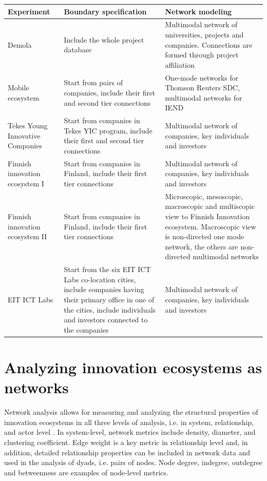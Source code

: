 \begingroup
{}\label{tab:networkdesign}
\begin{tabular}{p{3cm} p{4cm} p{5cm}}
\toprule
Experiment & Boundary specification & Network modeling \\
\midrule

Demola &
Include the whole project database &
Multimodal network of universities, projects and companies. Connections are formed through project affiliation \\

Mobile ecosystem &
Start from pairs of companies, include their first and second tier connections &
One-mode networks for Thomson Reuters SDC, multimodal networks for IEND \\

Tekes Young Innovative Companies &
Start from companies in Tekes YIC program, include their first and second tier connections &
Multimodal network of companies, key individuals and investors \\

Finnish innovation ecosystem I & 
Start from companies in Finland, include their first tier connections & 
Multimodal network of companies, key individuals and investors \\

Finnish innovation ecosystem II &
Start from companies in Finland, include their first tier connections &
Microscopic, mesoscopic, macroscopic and multiscopic view to Finnish Innovation ecosystem. Macroscopic view is non-directed one mode network, the others are non-directed multimodal networks \\

EIT ICT Labs &
Start from the six EIT ICT Labs co-location cities, include companies having their primary office in one of the cities, include individuals and investors connected to the companies &
Multimodal network of companies, key individuals and investors \\
\bottomrule
\end{tabular}
\endgroup

\section{Analyzing innovation ecosystems as networks}

Network analysis allows for measuring and analyzing the structural properties of innovation ecosystems in all three levels of analysis, i.e. in system, relationship, and actor level \citep{Jarvi2016TakingReview}. In system-level, network metrics include density, diameter, and clustering coefficient. Edge weight is a key metric in relationship level and, in addition, detailed relationship properties can be included in network data and used in the analysis of dyads, i.e. pairs of nodes. Node degree, indegree, outdegree and betweenness are examples of node-level metrics.

